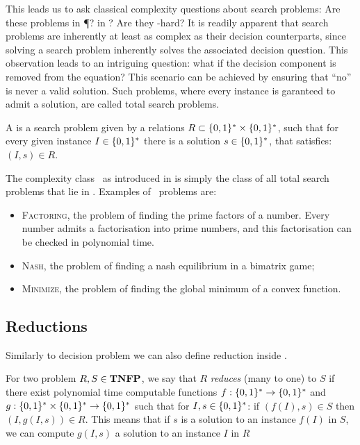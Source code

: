 This leads us to ask classical complexity questions about search problems: Are these problems in \P? in \NP? Are they \NP-hard? It is readily apparent that search problems are inherently at least as complex as their decision counterparts, since solving a search problem inherently solves the associated decision question. This observation leads to an intriguing question: what if the decision component is removed from the equation? This scenario can be achieved by ensuring that ``no'' is never a valid solution. Such problems, where every instance is garanteed to admit a solution, are called total search problems.

\begin{definition}
    A  is a search problem given by a relations $R\subset \{0, 1\}^* \times \{0, 1\}^*$, such that for every given instance $I\in
        \{0, 1\}^*$ there is a solution $s \in \{0, 1\}^*$, that satisfies: $(I, s) \in R$.
\end{definition}

The complexity class \TFNP\ as introduced in  is simply the class of all total search problems that lie in \NP. Examples of \TFNP\ problems are:
\begin{itemize}
    \item \textsc{Factoring}, the problem of finding the prime factors of a number. Every number admits a factorisation into prime numbers, and this factorisation can be checked in polynomial time.
    \item \textsc{Nash}, the problem of finding a nash equilibrium in a bimatrix game;
    \item \textsc{Minimize}, the problem of finding the global minimum of a convex function.
\end{itemize}

\subsection{Reductions}

Similarly to decision problem we can also define reduction inside \TFNP.

\begin{definition}
    For two problem $R, S \in \textbf{TNFP}$, we say that $R$ \emph{reduces} (many to one) to $S$ if there exist polynomial time computable functions $f : \{0, 1\}^* \rightarrow \{0, 1\}^*$ and $g : \{0, 1\}^* \times \{0, 1\}^* \rightarrow \{0, 1\}^*$ such that for $I, s \in \{0, 1\}^*$: if $(f(I), s) \in S$ then $(I, g(I, s)) \in R$. This means that if $s$ is a solution to an instance $f(I)$ in $S$, we can compute $g(I, s)$ a solution to an instance $I$ in $R$
\end{definition}

